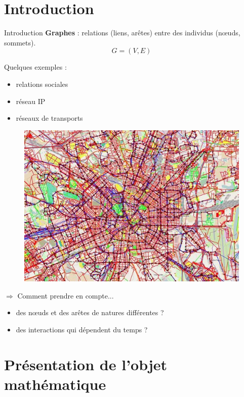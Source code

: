 \documentclass[15pt]{beamer}
\begin{document}
\section*{Introduction}
\begin{frame}{Introduction}
\textbf{Graphes} : relations (liens, arêtes) entre des individus (n\oe{}uds, sommets).
\[
	G=(V,E)
\]
\pause
\begin{minipage}{0.4\linewidth}
{\large Quelques exemples :}
\begin{itemize}
    \item relations sociales
    \item réseau IP
    \item réseaux de transports
\end{itemize}
\end{minipage}
\pause
\begin{minipage}{0.5\linewidth}
\begin{figure}
	\centering
    \includegraphics[width=\textwidth]{img/multimodalTransport.jpg}
\end{figure}
\end{minipage}
\pause

$\Rightarrow$ {\large Comment prendre en compte...}
\begin{itemize}
	\item des n\oe{}uds et des arêtes de natures différentes ?
    \item des interactions qui dépendent du temps ?
\end{itemize}
\end{frame}

\section{Présentation de l'objet mathématique}
\end{document}
